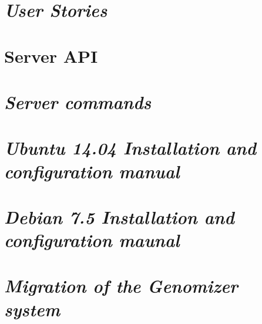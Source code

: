 \begin{appendix}

\chapter{\textit{User Stories}}

\chapter{Server API}

\chapter{\textit{Server commands}}

\chapter{\textit{Ubuntu 14.04 Installation and configuration manual}}

\chapter{\textit{Debian 7.5 Installation and configuration maunal}}

\chapter{\textit{Migration of the Genomizer system}}

\end{appendix}
